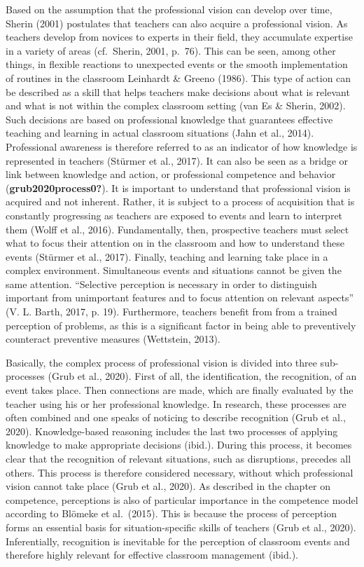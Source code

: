 \documentclass[
  man]{apa6}
\begin{document}
Based on the assumption that the professional vision can develop over time, Sherin (2001) postulates that teachers can also acquire a professional vision. As teachers develop from novices to experts in their field, they accumulate expertise in a variety of areas (cf.~Sherin, 2001, p.~76). This can be seen, among other things, in flexible reactions to unexpected events or the smooth implementation of routines in the classroom Leinhardt \& Greeno (1986). This type of action can be described as a skill that helps teachers make decisions about what is relevant and what is not within the complex classroom setting (van Es \& Sherin, 2002). Such decisions are based on professional knowledge that guarantees effective teaching and learning in actual classroom situations (Jahn et al., 2014). Professional awareness is therefore referred to as an indicator of how knowledge is represented in teachers (Stürmer et al., 2017). It can also be seen as a bridge or link between knowledge and action, or professional competence and behavior (\textbf{grub2020process0?}). It is important to understand that professional vision is acquired and not inherent. Rather, it is subject to a process of acquisition that is constantly progressing as teachers are exposed to events and learn to interpret them (Wolff et al., 2016). Fundamentally, then, prospective teachers must select what to focus their attention on in the classroom and how to understand these events (Stürmer et al., 2017). Finally, teaching and learning take place in a complex environment. Simultaneous events and situations cannot be given the same attention. ``Selective perception is necessary in order to distinguish important from unimportant features and to focus attention on relevant aspects'' (V. L. Barth, 2017, p. 19). Furthermore, teachers benefit from from a trained perception of problems, as this is a significant factor in being able to preventively counteract preventive measures (Wettstein, 2013).

Basically, the complex process of professional vision is divided into three sub-processes (Grub et al., 2020). First of all, the identification, the recognition, of an event takes place. Then connections are made, which are finally evaluated by the teacher using his or her professional knowledge. In research, these processes are often combined and one speaks of noticing to describe recognition (Grub et al., 2020). Knowledge-based reasoning includes the last two processes of applying knowledge to make appropriate decisions (ibid.). During this process, it becomes clear that the recognition of relevant situations, such as disruptions, precedes all others. This process is therefore considered necessary, without which professional vision cannot take place (Grub et al., 2020). As described in the chapter on competence, perceptions is also of particular importance in the competence model according to Blömeke et al.~(2015). This is because the process of perception forms an essential basis for situation-specific skills of teachers (Grub et al., 2020). Inferentially, recognition is inevitable for the perception of classroom events and therefore highly relevant for effective classroom management (ibid.).
\end{document}
